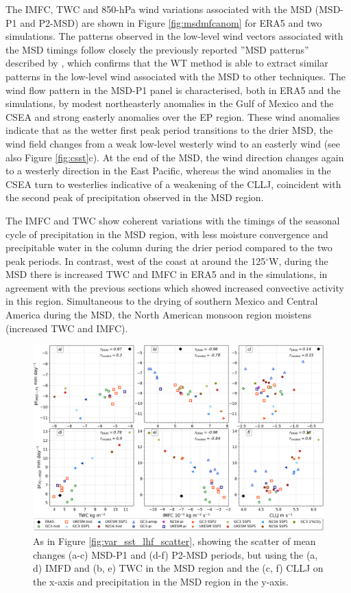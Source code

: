 The IMFC, TWC and 850-hPa wind variations associated with the MSD (MSD-P1 and P2-MSD) are shown in Figure \ref{fig:msdmfcanom} for ERA5 and two simulations. The patterns observed in the low-level wind vectors associated with the MSD timings follow closely the previously reported ''MSD patterns'' described by \cite{zermeno2019,zhao2020}, which confirms that the WT method is able to extract similar patterns in the low-level wind associated with the MSD to other techniques. 
The wind flow pattern in the MSD-P1 panel is characterised, both  in ERA5 and the simulations, by modest northeasterly anomalies in the Gulf of Mexico and the CSEA and strong easterly anomalies over the EP region. These wind anomalies indicate that as the wetter first peak period transitions to the drier MSD, the wind field changes from a weak low-level westerly wind to an easterly wind (see also Figure \ref{fig:csst}c). 
At the end of the MSD, the wind direction changes again to a westerly direction in the East Pacific, whereas the wind anomalies in the CSEA turn to westerlies indicative of a weakening of the CLLJ, coincident with the second peak of precipitation observed in the MSD region.

The IMFC and TWC show coherent variations with the timings of the seasonal cycle of precipitation in the MSD region, with less moisture convergence and precipitable water in the column during the drier period compared to the two peak periods. 
 In contrast, west of the coast at around the 125$^\circ$W, during the MSD there is increased TWC and IMFC in ERA5 and in the simulations, in agreement with the previous sections which showed increased convective activity in this region. Simultaneous to the drying of southern Mexico and Central America during the MSD, the North American monsoon region moistens (increased TWC and IMFC). 

 \begin{figure}[b!]
\includegraphics[width=\linewidth]{figures/imfd_scatter}
\caption[Scatterplot of TWC, IMFD and CLLJ]{As in Figure \ref{fig:var_sst_lhf_scatter}, showing the scatter of mean changes (a-c) MSD-P1 and (d-f) P2-MSD periods, but using the (a, d) IMFD and (b, e) TWC in the MSD region and the (c, f) CLLJ on the x-axis and precipitation in the MSD region in the y-axis.  }
\label{fig:imfd_scatter}
\end{figure}


